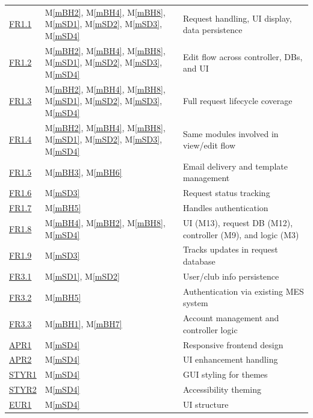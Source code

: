 \documentclass[12pt, titlepage]{article}
\newcommand{\mref}[1]{M\ref{#1}}
\begin{document}
\begin{longtable}{p{} p{} p{}}
\href{../../SRS/SRS.pdf#FROneOne}{ FR1.1 } & \mref{mBH2}, \mref{mBH4}, \mref{mBH8}, \mref{mSD1}, \mref{mSD2}, \mref{mSD3}, \mref{mSD4} & Request handling, UI display, data persistence \\
\href{../../SRS/SRS.pdf#FROneTwo}{ FR1.2 } & \mref{mBH2}, \mref{mBH4}, \mref{mBH8}, \mref{mSD1}, \mref{mSD2}, \mref{mSD3}, \mref{mSD4} & Edit flow across controller, DBs, and UI \\
\href{../../SRS/SRS.pdf#FROneThree}{ FR1.3 } & \mref{mBH2}, \mref{mBH4}, \mref{mBH8}, \mref{mSD1}, \mref{mSD2}, \mref{mSD3}, \mref{mSD4} & Full request lifecycle coverage \\
\href{../../SRS/SRS.pdf#FROneFour}{ FR1.4 } & \mref{mBH2}, \mref{mBH4}, \mref{mBH8}, \mref{mSD1}, \mref{mSD2}, \mref{mSD3}, \mref{mSD4} & Same modules involved in view/edit flow \\
\href{../../SRS/SRS.pdf#FROneFive}{ FR1.5 } & \mref{mBH3}, \mref{mBH6} & Email delivery and template management \\
\href{../../SRS/SRS.pdf#FROneSix}{ FR1.6 } & \mref{mSD3} & Request status tracking \\
\href{../../SRS/SRS.pdf#FROneSeven}{ FR1.7 } & \mref{mBH5} & Handles authentication \\
\href{../../SRS/SRS.pdf#FROneEight}{ FR1.8 } & \mref{mBH4}, \mref{mBH2}, \mref{mBH8}, \mref{mSD4} & UI (M13), request DB (M12), controller (M9), and logic (M3) \\
\href{../../SRS/SRS.pdf#FROneNine}{ FR1.9 } & \mref{mSD3} & Tracks updates in request database \\
\href{../../SRS/SRS.pdf#FRThreeOne}{ FR3.1 } & \mref{mSD1}, \mref{mSD2} & User/club info persistence \\
\href{../../SRS/SRS.pdf#FRThreeTwo}{ FR3.2 } & \mref{mBH5} & Authentication via existing MES system \\
\href{../../SRS/SRS.pdf#FRThreeThree}{ FR3.3 } & \mref{mBH1}, \mref{mBH7} & Account management and controller logic \\
\href{../../SRS/SRS.pdf#APROne}{ APR1 } & \mref{mSD4} & Responsive frontend design \\
\href{../../SRS/SRS.pdf#APRTwo}{ APR2 } & \mref{mSD4} & UI enhancement handling \\
\href{../../SRS/SRS.pdf#STYROne}{ STYR1 } & \mref{mSD4} & GUI styling for themes \\
\href{../../SRS/SRS.pdf#STYRTwo}{ STYR2 } & \mref{mSD4} & Accessibility theming \\
\href{../../SRS/SRS.pdf#EUROne}{ EUR1 } & \mref{mSD4} & UI structure \\

\end{longtable}
\end{document}
